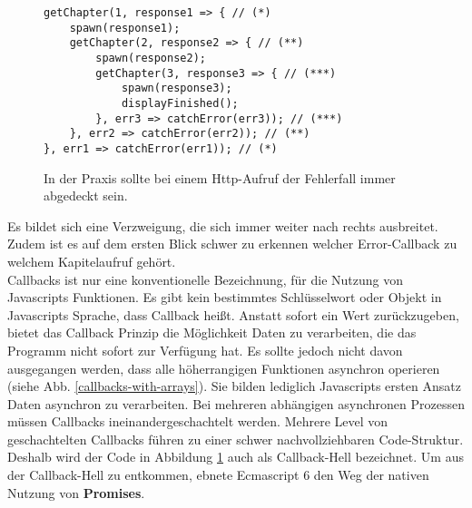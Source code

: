 \begin{figure}[H]
\begin{lstlisting}[basicstyle=\small]
getChapter(1, response1 => { // (*)
    spawn(response1);
    getChapter(2, response2 => { // (**)
        spawn(response2);
        getChapter(3, response3 => { // (***)
            spawn(response3);
            displayFinished();
        }, err3 => catchError(err3)); // (***)
    }, err2 => catchError(err2)); // (**)
}, err1 => catchError(err1)); // (*)
\end{lstlisting}
\caption{In der Praxis sollte bei einem Http-Aufruf der Fehlerfall immer abgedeckt sein.}
\label{Nested-Callback-with-catch-error}
\end{figure}

\noindent
Es bildet sich eine Verzweigung, die sich immer weiter nach rechts ausbreitet. Zudem ist es auf dem ersten Blick schwer zu erkennen welcher Error-Callback zu welchem Kapitelaufruf gehört.\\

\noindent
Callbacks ist nur eine konventionelle Bezeichnung, für die Nutzung von Javascripts Funktionen. Es gibt kein bestimmtes Schlüsselwort oder Objekt in Javascripts Sprache, dass Callback heißt. Anstatt sofort ein Wert zurückzugeben, bietet das Callback Prinzip die Möglichkeit Daten zu verarbeiten, die das Programm nicht sofort zur Verfügung hat. Es sollte jedoch nicht davon ausgegangen werden, dass alle höherrangigen Funktionen asynchron operieren (siehe Abb. \ref{callbacks-with-arrays}). Sie bilden lediglich Javascripts ersten Ansatz Daten asynchron zu verarbeiten. Bei mehreren abhängigen asynchronen Prozessen müssen Callbacks ineinandergeschachtelt werden. Mehrere Level von geschachtelten Callbacks führen zu einer schwer nachvollziehbaren Code-Struktur. Deshalb wird der Code in Abbildung \ref{Nested-Callback-with-catch-error} auch als \glqq{}Callback-Hell\grqq{} bezeichnet. Um aus der Callback-Hell zu entkommen, ebnete Ecmascript 6 den Weg der nativen Nutzung von \textbf{Promises}.



